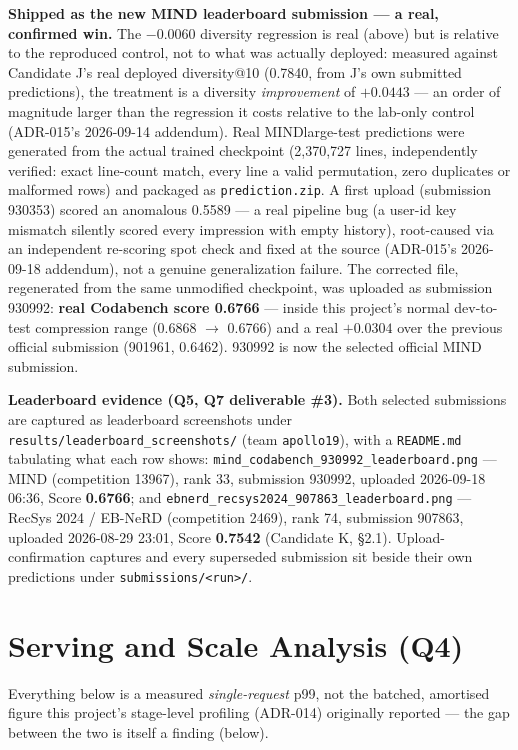 \documentclass[11pt]{article}
\begin{document}
\textbf{Shipped as the new MIND leaderboard submission --- a real, confirmed win.}
The $-0.0060$ diversity regression is real (above) but is relative to the
reproduced control, not to what was actually deployed: measured against
Candidate J's real deployed diversity@10 (0.7840, from J's own submitted
predictions), the treatment is a diversity \emph{improvement} of $+0.0443$ ---
an order of magnitude larger than the regression it costs relative to the
lab-only control (ADR-015's 2026-09-14 addendum). Real MINDlarge-test
predictions were generated from the actual trained checkpoint (2,370,727
lines, independently verified: exact line-count match, every line a valid
permutation, zero duplicates or malformed rows) and packaged as
\texttt{prediction.zip}. A first upload (submission 930353) scored an
anomalous 0.5589 --- a real pipeline bug (a user-id key mismatch silently
scored every impression with empty history), root-caused via an independent
re-scoring spot check and fixed at the source (ADR-015's 2026-09-18
addendum), not a genuine generalization failure. The corrected file,
regenerated from the same unmodified checkpoint, was uploaded as submission
930992: \textbf{real Codabench score 0.6766} --- inside this project's normal
dev-to-test compression range (0.6868 $\to$ 0.6766) and a real $+0.0304$ over
the previous official submission (901961, 0.6462). 930992 is now the selected
official MIND submission.

\textbf{Leaderboard evidence (Q5, Q7 deliverable \#3).} Both selected
submissions are captured as leaderboard screenshots under
\texttt{results/leaderboard\_screenshots/} (team \texttt{apollo19}), with a
\texttt{README.md} tabulating what each row shows:
\texttt{mind\_codabench\_930992\_leaderboard.png} --- MIND (competition 13967),
rank 33, submission 930992, uploaded 2026-09-18 06:36, Score \textbf{0.6766};
and \texttt{ebnerd\_recsys2024\_907863\_leaderboard.png} --- RecSys 2024 /
EB-NeRD (competition 2469), rank 74, submission 907863, uploaded 2026-08-29
23:01, Score \textbf{0.7542} (Candidate K, \S2.1). Upload-confirmation captures
and every superseded submission sit beside their own predictions under
\texttt{submissions/<run>/}.

\section{Serving and Scale Analysis (Q4)}

Everything below is a measured \emph{single-request} p99, not the batched,
amortised figure this project's stage-level profiling (ADR-014) originally
reported --- the gap between the two is itself a finding (below).
\end{document}
